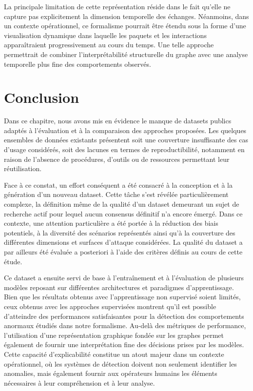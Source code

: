 \documentclass[a4paper,11pt,twoside]{StyleThese}
\begin{document}
La principale limitation de cette représentation réside dans le fait qu’elle ne capture pas explicitement la dimension temporelle des échanges. Néanmoins, dans un contexte opérationnel, ce formalisme pourrait être étendu sous la forme d’une visualisation dynamique dans laquelle les paquets et les interactions apparaîtraient progressivement au cours du temps. Une telle approche permettrait de combiner l’interprétabilité structurelle du graphe avec une analyse temporelle plus fine des comportements observés.

\section{Conclusion}
Dans ce chapitre, nous avons mis en évidence le manque de datasets publics adaptés à l’évaluation et à la comparaison des approches proposées. Les quelques ensembles de données existants présentent soit une couverture insuffisante des cas d’usage considérés, soit des lacunes en termes de reproductibilité, notamment en raison de l’absence de procédures, d’outils ou de ressources permettant leur réutilisation.

Face à ce constat, un effort conséquent a été consacré à la conception et à la génération d’un nouveau dataset. Cette tâche s’est révélée particulièrement complexe, la définition même de la qualité d’un dataset demeurant un sujet de recherche actif pour lequel aucun consensus définitif n’a encore émergé. Dans ce contexte, une attention particulière a été portée à la réduction des biais potentiels, à la diversité des scénarios représentés ainsi qu’à la couverture des différentes dimensions et surfaces d’attaque considérées. La qualité du dataset a par ailleurs été évaluée a posteriori à l’aide des critères définis au cours de cette étude.

Ce dataset a ensuite servi de base à l’entraînement et à l’évaluation de plusieurs modèles reposant sur différentes architectures et paradigmes d’apprentissage. Bien que les résultats obtenus avec l'apprentissage non supervisé soient limités, ceux obtenus avec les approches supervisées montrent qu'il est possible d'atteindre des performances satisfaisantes pour la détection des comportements anormaux étudiés dans notre formalisme. Au-delà des métriques de performance, l’utilisation d’une représentation graphique fondée sur les graphes permet également de fournir une interprétation fine des décisions prises par les modèles. Cette capacité d’explicabilité constitue un atout majeur dans un contexte opérationnel, où les systèmes de détection doivent non seulement identifier les anomalies, mais également fournir aux opérateurs humains les éléments nécessaires à leur compréhension et à leur analyse.


\ifdefined{}
\else


\end{document}
